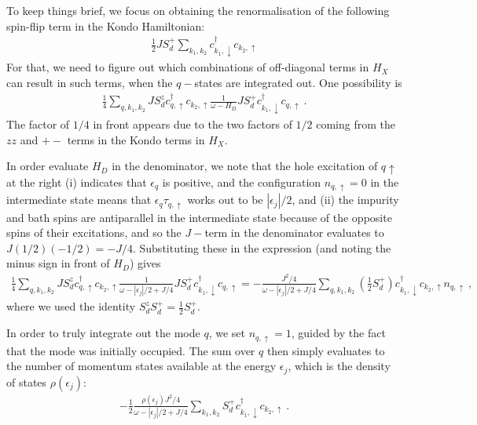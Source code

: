 To keep things brief, we focus on obtaining the renormalisation of the following spin-flip term in the Kondo Hamiltonian:
\begin{equation}\begin{aligned}\label{+-term}
	\frac{1}{2}J S_d^+\sum_{k_1,k_2}c^\dagger_{k_1, \downarrow} c_{k_2, \uparrow}
\end{aligned}\end{equation}
For that, we need to figure out which combinations of off-diagonal terms in \(H_X\) can result in such terms, when the \(q-\)states are integrated out. One possibility is
\begin{equation}\begin{aligned}\label{proc1}
	\frac{1}{4}\sum_{q, k_1, k_2} J S_d^z c^\dagger_{q, \uparrow} c_{k_2, \uparrow} \frac{1}{\omega - H_D} J S_d^+ c^\dagger_{k_1,\downarrow} c_{q, \uparrow}~.
\end{aligned}\end{equation}
The factor of \(1/4\) in front appears due to the two factors of \(1/2\) coming from the \(zz\) and \(+-\) terms in the Kondo terms in \(H_X\).

In order evaluate \(H_D\) in the denominator, we note that the hole excitation of \(q \uparrow\) at the right (i) indicates that \(\epsilon_q\) is positive, and the configuration \(n_{q, \uparrow} = 0\) in the intermediate state means that \(\epsilon_q \tau_{q, \uparrow}\) works out to be \(|\epsilon_j|/2\), and (ii) the impurity and bath spins are antiparallel in the intermediate state because of the opposite spins of their excitations, and so the \(J-\)term in the denominator evaluates to \(J(1/2)(-1/2) = -J/4\). Substituting these in the expression (and noting the minus sign in front of \(H_D\)) gives
\begin{equation}\begin{aligned}
	\frac{1}{4}\sum_{q, k_1, k_2}J S_d^z c^\dagger_{q, \uparrow} c_{k_2, \uparrow} \frac{1}{\omega - |\epsilon_j|/2 + J/4} J S_d^+ c^\dagger_{k_1,\downarrow} c_{q, \uparrow} = -\frac{J^2 / 4}{\omega - |\epsilon_j|/2 + J/4} \sum_{q, k_1, k_2}\left(\frac{1}{2}S_d^+\right) c^\dagger_{k_1, \downarrow} c_{k_2, \uparrow} n_{q, \uparrow}~,
\end{aligned}\end{equation}
where we used the identity \(S_d^z S_d^+ = \frac{1}{2}S_d^+\).

In order to truly integrate out the mode \(q\), we set \(n_{q,\uparrow}=1\), guided by the fact that the mode was initially occupied. The sum over \(q\) then simply evaluates to the number of momentum states available at the energy \(\epsilon_j\), which is the density of states \(\rho(\epsilon_j)\):
\begin{equation}\begin{aligned}
	-\frac{1}{2}\frac{\rho(\epsilon_j)J^2 / 4}{\omega - |\epsilon_j|/2 + J/4} \sum_{k_1, k_2}S_d^+ c^\dagger_{k_1, \downarrow} c_{k_2, \uparrow}~.
\end{aligned}\end{equation}


